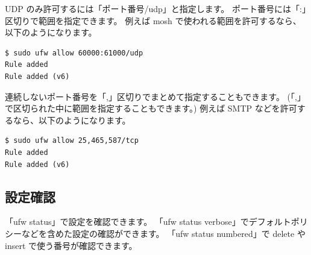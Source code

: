\documentclass[mingoth,a4paper]{jsarticle}
\begin{document}
UDP のみ許可するには「ポート番号/udp」と指定します。
ポート番号には「:」区切りで範囲を指定できます。
例えば mosh で使われる範囲を許可するなら、以下のようになります。

\begin{verbatim}
$ sudo ufw allow 60000:61000/udp
Rule added
Rule added (v6)
\end{verbatim}

連続しないポート番号を「,」区切りでまとめて指定することもできます。
(「,」で区切られた中に範囲を指定することもできます。)
例えば SMTP などを許可するなら、以下のようになります。

\begin{verbatim}
$ sudo ufw allow 25,465,587/tcp
Rule added
Rule added (v6)
\end{verbatim}

\subsection{設定確認}

「ufw status」で設定を確認できます。
「ufw status verbose」でデフォルトポリシーなどを含めた設定の確認ができます。
「ufw status numbered」で delete や insert で使う番号が確認できます。
\end{document}
